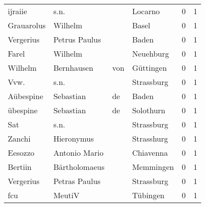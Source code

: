 \begin{center}
\begin{tiny}
\begin{longtabu}{llllrr}
                  ijraiie &                               s.n. &             &                                     Locarno &          0 &         1 \\
               Grauarolus &                            Wilhelm &             &                                       Basel &          0 &         1 \\
                Vergerius &                      Petrus Paulus &             &                                       Baden &          0 &         1 \\
                    Farel &                            Wilhelm &             &                                   Neuehburg &          0 &         1 \\
                  Wilhelm &                         Bernhausen &         von &                                   Güttingen &          0 &         1 \\
                     Vvw. &                               s.n. &             &                                  Strassburg &          0 &         1 \\
                Aübespine &                          Sebastian &          de &                                       Baden &          0 &         1 \\
                 übespine &                          Sebastian &          de &                                   Solothurn &          0 &         1 \\
                      Sat &                               s.n. &             &                                  Strassburg &          0 &         1 \\
                   Zanchi &                         Hieronymus &             &                                  Strasshurg &          0 &         1 \\
                  Eesozzo &                      Antonio Mario &             &                                   Chiavenna &          0 &         1 \\
                  Bertiin &                      Bärtholomaeus &             &                                   Memmingen &          0 &         1 \\
                Vergerius &                      Petras Paulus &             &                                  Strassburg &          0 &         1 \\
                      fcu &                             MeutiV &             &                                    Tübingen &          0 &         1 \\

\end{longtabu}
\end{tiny}
\end{center}
